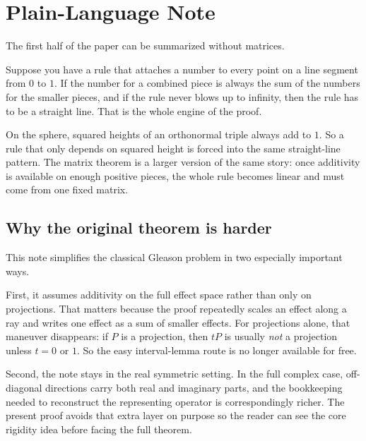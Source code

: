 \section{Plain-Language Note}

The first half of the paper can be summarized without matrices.

Suppose you have a rule that attaches a number to every point on a line segment from $0$ to $1$. If the number for a combined piece is always the sum of the numbers for the smaller pieces, and if the rule never blows up to infinity, then the rule has to be a straight line. That is the whole engine of the proof.

On the sphere, squared heights of an orthonormal triple always add to $1$. So a rule that only depends on squared height is forced into the same straight-line pattern. The matrix theorem is a larger version of the same story: once additivity is available on enough positive pieces, the whole rule becomes linear and must come from one fixed matrix.

\subsection{Why the original theorem is harder}

This note simplifies the classical Gleason problem in two especially important ways.

First, it assumes additivity on the full effect space rather than only on projections. That matters because the proof repeatedly scales an effect along a ray and writes one effect as a sum of smaller effects. For projections alone, that maneuver disappears: if $P$ is a projection, then $tP$ is usually \emph{not} a projection unless $t=0$ or $1$. So the easy interval-lemma route is no longer available for free.

Second, the note stays in the real symmetric setting. In the full complex case, off-diagonal directions carry both real and imaginary parts, and the bookkeeping needed to reconstruct the representing operator is correspondingly richer. The present proof avoids that extra layer on purpose so the reader can see the core rigidity idea before facing the full theorem.
